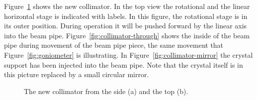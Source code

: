 Figure~\ref{fig:collimator} shows the new collimator. In the top view the rotational and the linear horizontal stage is indicated with labels. In this figure, the rotational stage is in its outer position. During operation it will be pushed forward by the linear axis into the beam pipe. Figure~\ref{fig:collimator-through} shows the inside of the beam pipe during movement of the beam pipe piece, the same movement that Figure~\ref{fig:goniometer} is illustrating. In Figure~\ref{fig:collimator-mirror} the crystal support has been injected into the beam pipe. Note that the crystal itself is in this picture replaced by a small circular mirror.

\begin{figure}[tpb]
  \centering %
  \qquad
  \caption{\label{fig:collimator} The new collimator from the side (a) and the top (b).}
\end{figure}

